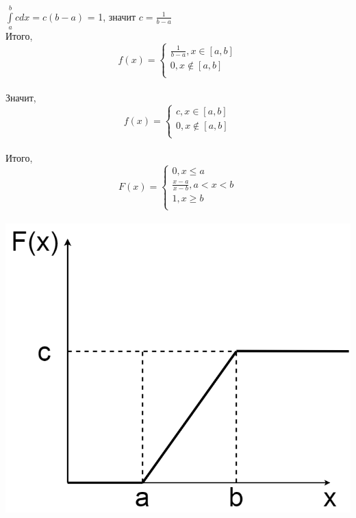 \documentclass[russian, 12pt, fleqn]{article}
\begin{document}
$\int\limits_{a}^{b} c dx = c(b - a)$ = 1, значит $c = \frac{1}{b - a}$\\
Итого, \\
\begin{equation*} 
f(x)=
 \begin{cases}
   \frac{1}{b - a},   x \in [a, b]\\
   0 , x \notin [a, b]\\
 \end{cases}
\end{equation*}\\
Значит, \\
\begin{equation*} 
f(x)=
 \begin{cases}
   c,   x \in [a, b]\\
   0 , x \notin [a, b]\\
 \end{cases}
\end{equation*}\\
Итого, \begin{equation*} 
F(x)=
 \begin{cases}
    0,   x \leq a\\
   \frac{x - a}{x - b} , a < x < b\\
   1, x \geq b\\
\end{cases}
\end{equation*}\\
\includegraphics[scale=0.2]{Gr2.png}\\	
\end{document}
